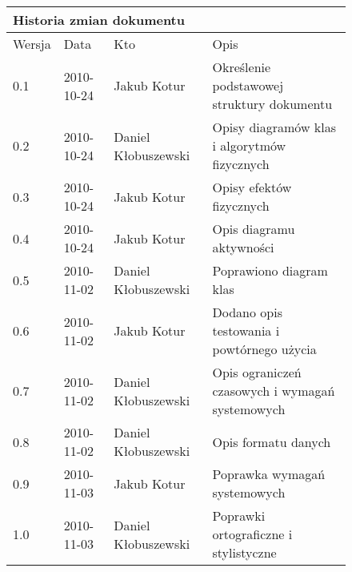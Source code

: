 \begin{figure}[h]
	\centering

\begin{tabular}{|p{}|p{}|p{}|p{}|}
	\hline
	\multicolumn{4}{|l|}{Historia zmian dokumentu} \\
	\hline
	Wersja & Data & Kto & Opis \\
	\hline
	0.1 & 2010-10-24 & Jakub Kotur &
	Określenie podstawowej struktury dokumentu \\
	\hline
	0.2 & 2010-10-24 & Daniel Kłobuszewski &
	Opisy diagramów klas i algorytmów fizycznych \\
	\hline
	0.3 & 2010-10-24 & Jakub Kotur &
	Opisy efektów fizycznych \\
	\hline
	0.4 & 2010-10-24 & Jakub Kotur &
	Opis diagramu aktywności \\
	\hline
	0.5 & 2010-11-02 & Daniel Kłobuszewski &
	Poprawiono diagram klas \\
	\hline
	0.6 & 2010-11-02 & Jakub Kotur &
	Dodano opis testowania i powtórnego użycia \\
	\hline
	0.7 & 2010-11-02 & Daniel Kłobuszewski &
	Opis ograniczeń czasowych i wymagań systemowych \\
	\hline
	0.8 & 2010-11-02 & Daniel Kłobuszewski &
	Opis formatu danych \\
	\hline
	0.9 & 2010-11-03 & Jakub Kotur &
	Poprawka wymagań systemowych \\
	\hline
	1.0 & 2010-11-03 & Daniel Kłobuszewski &
	Poprawki ortograficzne i stylistyczne \\
	\hline
\end{tabular}

	\label{tab:metric}
\end{figure}

